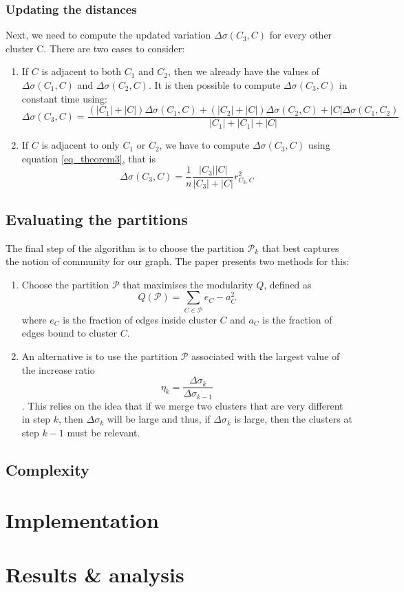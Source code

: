 \documentclass[12pt]{article}
\theoremstyle{definition}
\begin{document}
\subsubsection{Updating the distances}
Next, we need to compute the updated variation $\Delta\sigma(C_3, C)$ for every other cluster C. There are two cases to consider:
\begin{enumerate}
	\item If $C$ is adjacent to both $C_1$ and $C_2$, then we already have the values of $\Delta\sigma(C_1, C)$ and $\Delta\sigma(C_2, C)$. It is then possible to compute $\Delta\sigma(C_3, C)$ in constant time using:
	\[\Delta\sigma(C_3, C) = \frac{(|C_1| + |C|) \Delta\sigma(C_1,C) + (|C_2| + |C|) \Delta\sigma(C_2,C) + |C| \Delta\sigma(C_1,C_2)}{|C_1| + |C_1| + |C|}\]
	\item If $C$ is adjacent to only $C_1$ or $C_2$, we have to compute $\Delta\sigma(C_3, C)$ using equation \ref{eq_theorem3}, that is
	\[ \Delta\sigma(C_3,C) = \frac{1}{n}\frac{|C_3||C|}{|C_3| + |C|} r_{C_3,C}^2 \]
\end{enumerate}

\subsection{Evaluating the partitions}
The final step of the algorithm is to choose the partition $\mathcal{P}_k$ that best captures the notion of community for our graph. The paper presents two methods for this:
\begin{enumerate}
	\item Choose the partition $\mathcal{P}$ that maximises the modularity $Q$, defined as
	\[ Q(\mathcal{P}) = \sum	_{C \in \mathcal{P}} e_C - a_C^2\] 
	where $e_C$ is the fraction of edges inside cluster $C$ and $a_C$ is the fraction of edges bound to cluster $C$.
	\item An alternative is to use the partition $\mathcal{P}$ associated with the largest value of the increase ratio
	\[ \eta_k = \frac{\Delta\sigma_k}{\Delta\sigma_{k-1}}\].
	This relies on the idea that if we merge two clusters that are very different in step $k$, then $\Delta\sigma_k$ will be large and thus, if $\Delta\sigma_k$ is large, then the clusters at step $k-1$ must be relevant.
\end{enumerate}

\subsection{Complexity}

\section{Implementation}
\section{Results \& analysis}
\end{document}
